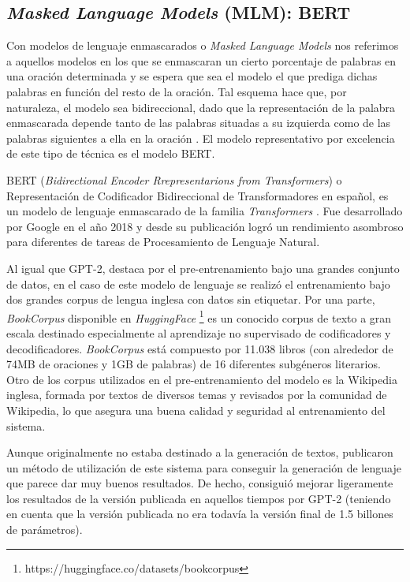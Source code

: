 \subsection{\textit{Masked Language Models} (MLM): BERT}
\label{sec:mlm}
Con modelos de lenguaje enmascarados o \textit{Masked Language Models} nos referimos a aquellos modelos en los que se enmascaran un cierto porcentaje de palabras en una oración determinada y se espera que sea el modelo el que prediga dichas palabras en función del resto de la oración. Tal esquema hace que, por naturaleza, el modelo sea bidireccional, dado que la representación de la palabra enmascarada depende tanto de las palabras situadas a su izquierda como de las palabras siguientes a ella en la oración \citep{rothman-2022}. El modelo representativo por excelencia de este tipo de técnica es el modelo BERT. 

BERT (\textit{Bidirectional Encoder Rrepresentarions from Transformers}) o Representación de Codificador Bidireccional de Transformadores en español, es un modelo de lenguaje enmascarado de la familia \textit{Transformers} \citep{Devlin2019BERTPO}. Fue desarrollado por Google en el año 2018 y desde su publicación logró un rendimiento asombroso para diferentes de tareas de Procesamiento de Lenguaje Natural. 

Al igual que GPT-2, destaca por el pre-entrenamiento bajo una grandes conjunto de datos, en el caso de este modelo de lenguaje se realizó el entrenamiento bajo dos grandes corpus de lengua inglesa con datos sin etiquetar. Por una parte, \textit{BookCorpus} \citep{Zhu_2015_ICCV} disponible en \textit{HuggingFace} \footnote{https://huggingface.co/datasets/bookcorpus} es un conocido corpus de texto a gran escala destinado especialmente al aprendizaje no supervisado de codificadores y decodificadores. \textit{BookCorpus} está compuesto por 11.038 libros (con alrededor de 74MB de oraciones y 1GB de palabras) de 16 diferentes subgéneros literarios. Otro de los corpus utilizados en el pre-entrenamiento del modelo es la Wikipedia inglesa, formada por textos de diversos temas y revisados por la comunidad de Wikipedia, lo que asegura una buena calidad y seguridad al entrenamiento del sistema.


Aunque originalmente no estaba destinado a la generación de textos, \cite{wang-cho-2019-bert} publicaron un método de utilización de este sistema para conseguir la generación de lenguaje que parece dar muy buenos resultados. De hecho, consiguió mejorar ligeramente los resultados de la versión publicada en aquellos tiempos por GPT-2 (teniendo en cuenta que la versión publicada no era todavía la versión final de 1.5 billones de parámetros). 

